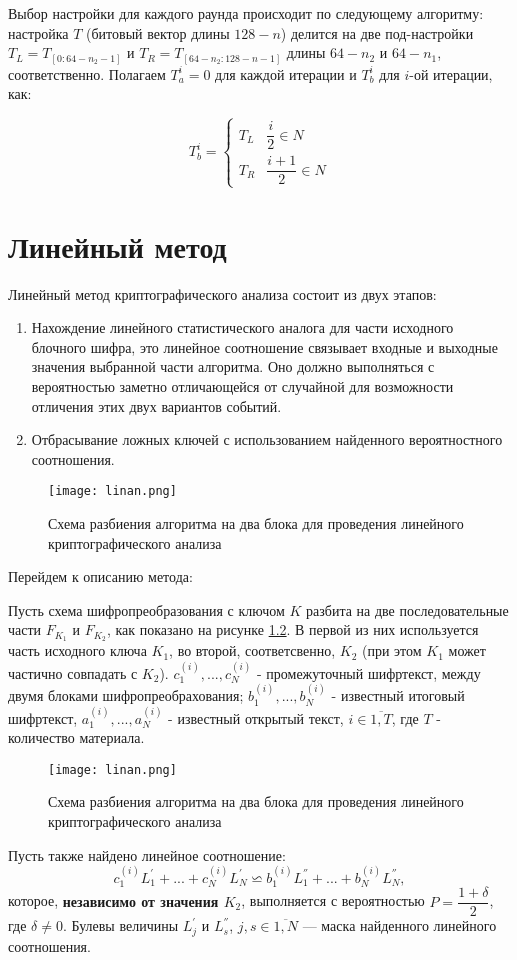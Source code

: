 \documentclass[utf8x, 14pt]{G7-32} %
\begin{document}
Выбор настройки для каждого раунда происходит по следующему алгоритму: настройка $T$ (битовый вектор длины $128-n$) делится на две под-настройки $T_L = T_{ [ 0:64-n_2-1 ] }$ и $T_R=T_{ [ 64-n_2:128-n-1 ] }$ длины $64-n_2$ и $64-n_1$, соответственно. Полагаем $T_a^i=0$ для каждой итерации и $T_b^i$ для $i$-ой итерации, как:

$$ T_b^i =
\begin{cases}
T_L & \dfrac{i}{2} \in N \\
T_R & \dfrac{i+1}{2} \in N
\end{cases} $$

\chapter{Линейный метод}

Линейный метод криптографического анализа состоит из двух этапов: 
\begin{enumerate}
    \item Нахождение линейного статистического аналога для части исходного блочного шифра, это линейное соотношение связывает входные и выходные значения выбранной части алгоритма. Оно должно выполняться с вероятностью заметно отличающейся от случайной для возможности отличения этих двух вариантов событий.
    \item Отбрасывание ложных ключей с использованием найденного вероятностного соотношения.
\end{enumerate}

\begin{figure}[h!]
	\centering
	\texttt{[image: linan.png]}
	\caption{Схема разбиения алгоритма на два блока для проведения линейного криптографического анализа}
	\label{fig:linan}
\end{figure}

Перейдем к описанию метода:

Пусть схема шифропреобразования с ключом $K$ разбита на две последовательные части $F_{K_1}$ и $F_{K_2}$, как показано на рисунке \ref{fig:linan}. В первой из них используется часть исходного ключа $K_1$, во второй, соответсвенно, $K_2$ (при этом $K_1$ может частично совпадать с $K_2$). $c_1^{(i)}, ..., c_N^{(i)}$  - промежуточный шифртекст, между двумя блоками шифропреобрахования; $b_1^{(i)}, ..., b_N^{(i)}$ - известный итоговый шифртекст, $a_1^{(i)}, ..., a_N^{(i)}$ - известный открытый текст, $i \in \overline{1,T}$, где $T$ - количество материала.
\begin{figure}[h!]
	\centering
	\texttt{[image: linan.png]}
	\caption{Схема разбиения алгоритма на два блока для проведения линейного криптографического анализа}
	\label{fig:linan}
\end{figure}
 Пусть также найдено линейное соотношение:
\begin{equation}
\label{eqn:eq1}
c_1^{(i)} L_1^{'} + ... + c_N^{(i)} L_N^{'} \backsimeq b_1^{(i)} L_1^{''} + ... + b_N^{(i)} L_N^{''} ,\end{equation}
 которое, \textbf{независимо от значения $K_2$}, выполняется с вероятностью $P = \dfrac{1+\delta}{2}$, где $\delta \neq 0$. Булевы величины $L_j^{'}$ и $L_s^{''}$, $j,s \in \overline{1,N}$ --- маска найденного линейного соотношения.
\end{document}
